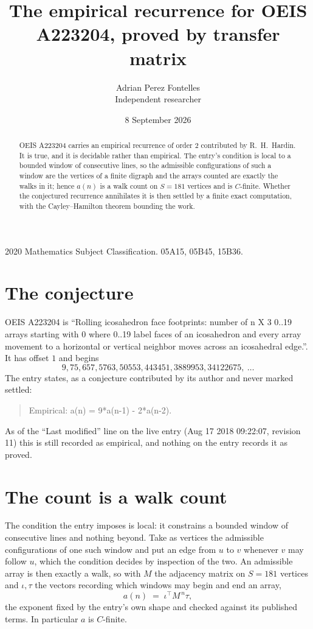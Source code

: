 \documentclass[11pt,a4paper]{article}
\title{The empirical recurrence for OEIS A223204, proved by transfer matrix}
\author{Adrian Perez Fontelles\\ \small Independent researcher}
\date{8 September 2026}
\theoremstyle{plain}
\theoremstyle{definition}
\begin{document}
\maketitle

\begin{abstract}
OEIS A223204 carries an empirical recurrence of order $2$ contributed by R.~H.~Hardin. It is
true, and it is decidable rather than empirical. The entry's condition is local to a bounded window of consecutive lines, so
the admissible configurations of such a window are the vertices of a finite digraph and the
arrays counted are exactly the walks in it; hence $a(n)$ is a walk count on $S=181$ vertices
and is $C$-finite. Whether the conjectured recurrence annihilates it is then settled by a
finite exact computation, with the Cayley--Hamilton theorem bounding the work.
\end{abstract}

\noindent\small 2020 Mathematics Subject Classification. 05A15, 05B45, 15B36.\normalsize

\section{The conjecture}

OEIS A223204 is ``Rolling icosahedron face footprints: number of n X 3 0..19 arrays starting with 0 where 0..19 label faces of an icosahedron and every array movement to a horizontal or vertical neighbor moves across an icosahedral edge.''. It has offset $1$ and begins
\[
9, 75, 657, 5763, 50553, 443451, 3889953, 34122675,\ \dots
\]
The entry states, as a conjecture contributed by its author and never marked settled:
\begin{quote}
Empirical: a(n) = 9*a(n-1) - 2*a(n-2).
\end{quote}
As of the ``Last modified'' line on the live entry (Aug 17 2018 09:22:07, revision 11) this is still
recorded as empirical, and nothing on the entry records it as proved.

\section{The count is a walk count}

The condition the entry imposes is local: it constrains a bounded window of consecutive lines and nothing beyond. Take as
vertices the admissible configurations of one such window and put an edge from $u$ to $v$
whenever $v$ may follow $u$, which the condition decides by inspection of the two. An
admissible array is then exactly a walk, so with $M$ the adjacency matrix on $S=181$ vertices
and $\iota,\tau$ the vectors recording which windows may begin and end an array,
\[
a(n)\;=\;\iota^{\!\top}M^{\,n}\tau ,
\]
the exponent fixed by the entry's own shape and checked against its published terms. In
particular $a$ is $C$-finite.
\end{document}
